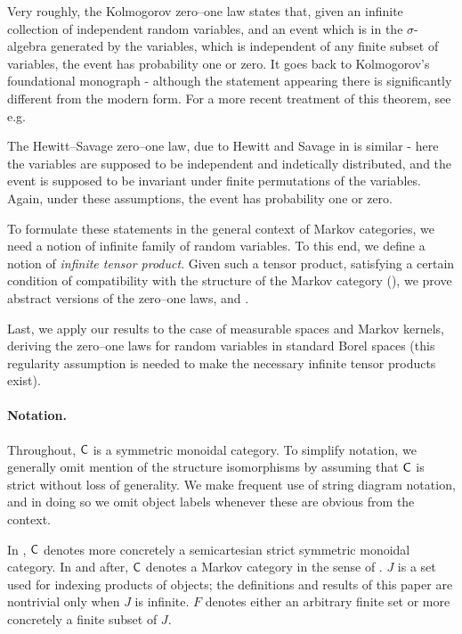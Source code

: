 \documentclass[11pt]{article}
\begin{document}
Very roughly, the Kolmogorov zero--one law states that, given an infinite collection of independent random variables, and an event which is in the $\sigma$-algebra generated by the variables, which is independent of any finite subset of variables, the event has probability one or zero.
It goes back to Kolmogorov's foundational monograph \cite{kolmogorovgerm} - although the statement appearing there is significantly different from the modern form.
For a more recent treatment of this theorem, see e.g. \cite[Theorem~2.37]{klenke}


The Hewitt--Savage zero--one law, due to Hewitt and Savage in \cite[Theorem~11.3]{hewitt_savage} is similar - here the variables are supposed to be independent and indetically distributed, and the event is supposed to be invariant under finite permutations of the variables. Again, under these assumptions, the event has probability one or zero.

To formulate these statements in the general context of Markov categories, we need a notion of infinite family of random variables.
To this end, we define a notion of \emph{infinite tensor product}. Given such a tensor product, satisfying a certain condition of compatibility with the structure of the Markov category (), we prove abstract versions of the zero--one laws,  and .

Last, we apply our results to the case of measurable spaces and Markov kernels, deriving the zero--one laws for random variables in standard Borel spaces (this regularity assumption is needed to make the necessary infinite tensor products exist).

\paragraph*{Notation.} 

Throughout, $\mathsf{C}$ is a symmetric monoidal category. To simplify notation, we generally omit mention of the structure isomorphisms by assuming that $\mathsf{C}$ is strict without loss of generality. We make frequent use of string diagram notation, and in doing so we omit object labels whenever these are obvious from the context.

In , $\mathsf{C}$ denotes more concretely a semicartesian strict symmetric monoidal category. In  and after, $\mathsf{C}$ denotes a Markov category in the sense of . $J$ is a set used for indexing products of objects; the definitions and results of this paper are nontrivial only when $J$ is infinite. $F$ denotes either an arbitrary finite set or more concretely a finite subset of $J$.
\end{document}
